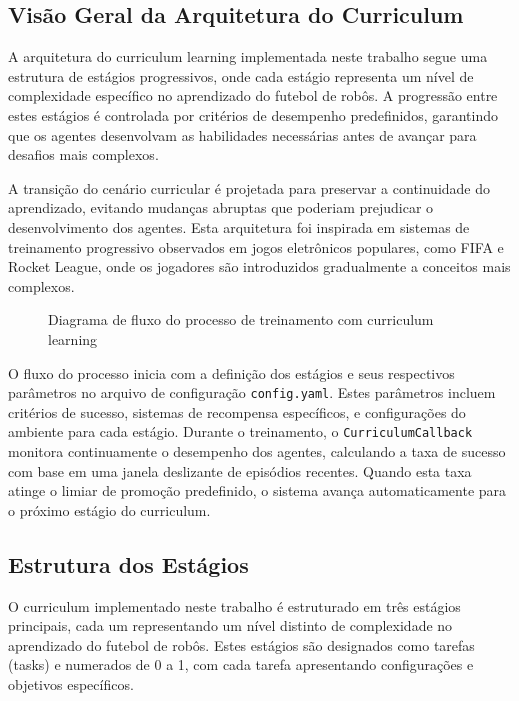\subsection{Visão Geral da Arquitetura do Curriculum}

A arquitetura do curriculum learning implementada neste trabalho segue uma estrutura de estágios progressivos, onde cada estágio representa um nível de complexidade específico no aprendizado do futebol de robôs. A progressão entre estes estágios é controlada por critérios de desempenho predefinidos, garantindo que os agentes desenvolvam as habilidades necessárias antes de avançar para desafios mais complexos.

A transição do cenário curricular é projetada para preservar a continuidade do aprendizado, evitando mudanças abruptas que poderiam prejudicar o desenvolvimento dos agentes. Esta arquitetura foi inspirada em sistemas de treinamento progressivo observados em jogos eletrônicos populares, como FIFA e Rocket League, onde os jogadores são introduzidos gradualmente a conceitos mais complexos.

\begin{figure}[H]
    \centering
    \caption{Diagrama de fluxo do processo de treinamento com curriculum learning}
    \label{fig:diagrama_curriculum}
\end{figure}

O fluxo do processo inicia com a definição dos estágios e seus respectivos parâmetros no arquivo de configuração \texttt{config.yaml}. Estes parâmetros incluem critérios de sucesso, sistemas de recompensa específicos, e configurações do ambiente para cada estágio. Durante o treinamento, o \texttt{CurriculumCallback} monitora continuamente o desempenho dos agentes, calculando a taxa de sucesso com base em uma janela deslizante de episódios recentes. Quando esta taxa atinge o limiar de promoção predefinido, o sistema avança automaticamente para o próximo estágio do curriculum.

\subsection{Estrutura dos Estágios}

O curriculum implementado neste trabalho é estruturado em três estágios principais, cada um representando um nível distinto de complexidade no aprendizado do futebol de robôs. Estes estágios são designados como tarefas (tasks) e numerados de 0 a 1, com cada tarefa apresentando configurações e objetivos específicos.

